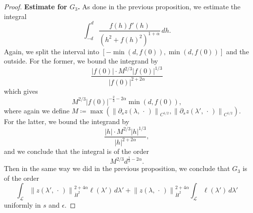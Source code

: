 \documentclass[reqno,centertags,12pt]{amsart}
\theoremstyle{definition}
\numberwithin{equation}{section}
\newcommand{\abs}[1]{\left\lvert#1\right\rvert}
\newcommand{\norm}[1]{\left\|#1\right\|}
\begin{document}
\begin{proof}
    \textbf{Estimate for $G_{3}$.} As done in the previous proposition,
    we estimate the integral
    \[
        \int_{-d}^{d}\frac{f(h)f'(h)}{\left(h^{2}+f(h)^{2}\right)^{1+\alpha}}\,dh.
    \]
    Again, we split the interval into $[-\min(d,f(0)),\min(d,f(0))]$ and the outside.
    For the former, we bound the integrand by
    \[
        \frac{\abs{f(0)}\cdot M^{2/3}\abs{f(0)}^{1/3}}
        {\abs{f(0)}^{2+2\alpha}}
    \]
    which gives
    \[
        M^{2/3}
        \abs{f(0)}^{-\frac{2}{3}-2\alpha}\min(d,f(0)),
    \]
    where again we define $M\coloneqq\max\left(
        \norm{\partial_{s}z(\lambda,\,\cdot\,)}_{C^{1/2}},
        \norm{\partial_{s}z(\lambda',\,\cdot\,)}_{C^{1/2}}
    \right)$. For the latter, we bound the integrand by
    \[
        \frac{\abs{h}\cdot M^{2/3}\abs{h}^{1/3}}
        {\abs{h}^{2+2\alpha}},
    \]
    and we conclude that the integral is of the order
    \[
        M^{2/3}d^{\frac{1}{3}-2\alpha}.
    \]
    Then in the same way we did in the previous proposition, we conclude that
    $G_{3}$ is of the order
    \[
        \int_{\mathcal{L}}
        \norm{z(\lambda',\,\cdot\,)}_{\dot{H}^{2}}^{2+4\alpha}\ell(\lambda')\,d\lambda'
        + \norm{z(\lambda,\,\cdot\,)}_{\dot{H}^{2}}^{2+4\alpha}
        \int_{\mathcal{L}}\ell(\lambda')\,d\lambda'
    \]
    uniformly in $s$ and $\epsilon$.


\end{proof}
\end{document}

